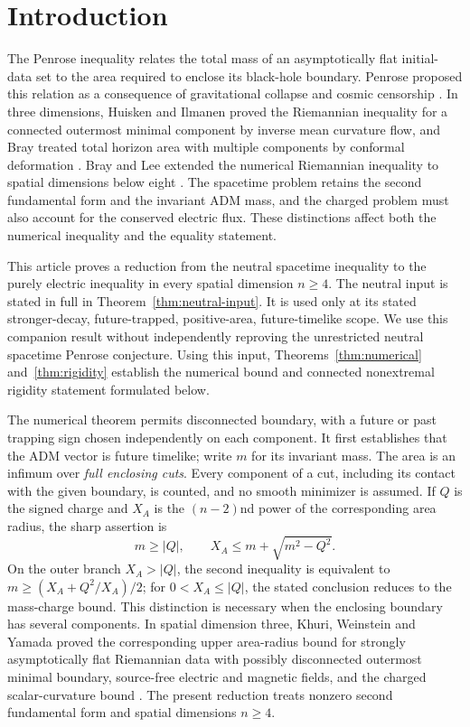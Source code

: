 \section{Introduction}\label{sec:introduction}

The Penrose inequality relates the total mass of an asymptotically flat initial-data set to the area required to enclose its black-hole boundary. Penrose proposed this relation as a consequence of gravitational collapse and cosmic censorship \cite{Penrose1973}. In three dimensions, Huisken and Ilmanen proved the Riemannian inequality for a connected outermost minimal component by inverse mean curvature flow, and Bray treated total horizon area with multiple components by conformal deformation \cite{HuiskenIlmanen2001,Bray2001}. Bray and Lee extended the numerical Riemannian inequality to spatial dimensions below eight \cite{BrayLee2009}. The spacetime problem retains the second fundamental form and the invariant ADM mass, and the charged problem must also account for the conserved electric flux. These distinctions affect both the numerical inequality and the equality statement.

This article proves a reduction from the neutral spacetime inequality to the purely electric inequality in every spatial dimension $n\ge4$. The neutral input is stated in full in Theorem~\ref{thm:neutral-input}. It is used only at its stated stronger-decay, future-trapped, positive-area, future-timelike scope. We use this companion result without independently reproving the unrestricted neutral spacetime Penrose conjecture. Using this input, Theorems~\ref{thm:numerical} and~\ref{thm:rigidity} establish the numerical bound and connected nonextremal rigidity statement formulated below.

The numerical theorem permits disconnected boundary, with a future or past trapping sign chosen independently on each component. It first establishes that the ADM vector is future timelike; write $m$ for its invariant mass. The area is an infimum over \emph{full enclosing cuts}. Every component of a cut, including its contact with the given boundary, is counted, and no smooth minimizer is assumed. If $Q$ is the signed charge and $X_A$ is the $(n-2)$nd power of the corresponding area radius, the sharp assertion is
\begin{equation}\label{intro:bound}
 m\ge |Q|,\qquad X_A\le m+\sqrt{m^2-Q^2}.
\end{equation}
On the outer branch $X_A>|Q|$, the second inequality is equivalent to $m\ge (X_A+Q^2/X_A)/2$; for $0<X_A\le|Q|$, the stated conclusion reduces to the mass-charge bound. This distinction is necessary when the enclosing boundary has several components. In spatial dimension three, Khuri, Weinstein and Yamada proved the corresponding upper area-radius bound for strongly asymptotically flat Riemannian data with possibly disconnected outermost minimal boundary, source-free electric and magnetic fields, and the charged scalar-curvature bound \cite[Theorem~1.1 and Corollary~1.2]{KhuriWeinsteinYamada2017}. The present reduction treats nonzero second fundamental form and spatial dimensions $n\ge4$.

